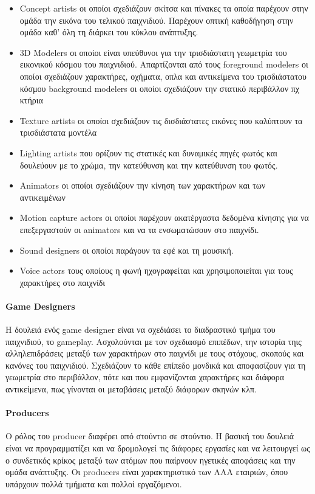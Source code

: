 \documentclass[oneside, 12pt]{book}
\begin{document}
	\begin{itemize}
		\item Concept artists οι οποίοι σχεδιάζουν σκίτσα και πίνακες τα οποία παρέχουν στην ομάδα την εικόνα του τελικού παιχνιδιού. Παρέχουν οπτική καθοδήγηση στην ομάδα καθ' όλη τη διάρκει του κύκλου ανάπτυξης.
		\item 3D Modelers οι οποίοι είναι υπεύθυνοι για την τρισδιάστατη γεωμετρία του εικονικού κόσμου του παιχνιδιού. Απαρτίζονται από τους
		foreground modelers οι οποίοι σχεδιάζουν χαρακτήρες, οχήματα, οπλα και αντικείμενα του τρισδιάστατου κόσμου
		background modelers οι οποίοι σχεδιάζουν την στατικό περιβάλλον πχ κτήρια
		\item Texture artists οι οποίοι σχεδιάζουν τις δισδιάστατες εικόνες που καλύπτουν τα τρισδιάστατα μοντέλα
		\item Lighting artists που ορίζουν τις στατικές και δυναμικές πηγές φωτός και δουλεύουν με το χρώμα, την κατεύθυνση και την κατεύθυνση του φωτός.
		\item Animators οι οποίοι σχεδιάζουν την κίνηση των χαρακτήρων και των αντικειμένων
		\item Motion capture actors οι οποίοι παρέχουν ακατέργαστα δεδομένα κίνησης για να επεξεργαστούν οι animators και να τα ενσωματώσουν στο παιχνίδι.
		\item Sound designers οι οποίοι παράγουν τα εφέ και τη μουσική.
		\item Voice actors τους οποίους η φωνή ηχογραφείται και χρησιμοποιείται για τους χαρακτήρες στο παιχνίδι
	\end{itemize}
	
	\paragraph{Game Designers}
	Η δουλειά ενός game designer είναι να σχεδιάσει το διαδραστικό τμήμα του παιχνιδιού, το gameplay. Ασχολούνται με τον σχεδιασμό επιπέδων, την ιστορία τηις αλληλεπιδράσεις μεταξύ των χαρακτήρων στο παιχνίδι με τους στόχους, σκοπούς και κανόνες του παιχνιδιού.
	Σχεδιάζουν το κάθε επίπεδο μονδικά και αποφασίζουν για τη γεωμετρία στο περιβάλλον, πότε και που εμφανίζονται χαρακτήρες και διάφορα αντικείμενα, πως γίνονται οι μεταβάσεις μεταξύ διάφορων σκηνών κλπ.
	
	\paragraph{Producers}
	Ο ρόλος του producer διαφέρει από στούντιο σε στούντιο. Η βασική του δουλειά είναι να προγραμματίζει και να δρομολογεί τις διάφορες εργασίες και να λειτουργεί ως ο συνδετικός κρίκος μεταξύ των ατόμων που παίρνουν ηγετικές αποφάσεις και την ομάδα ανάπτυξης. Οι producers είναι χαρακτηριστικό των ΑΑΑ εταιριών, όπου υπάρχουν πολλά τμήματα και πολλοί εργαζόμενοι.
		
\end{document}

